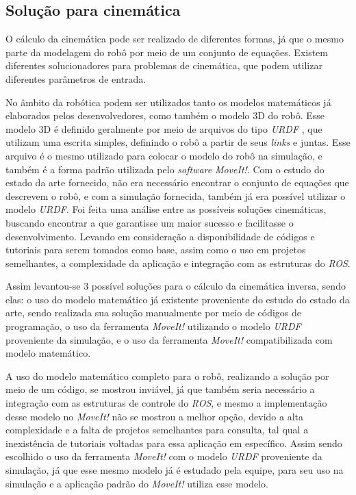 \subsection{Solução para cinemática}\label{sec:sol_cine}
O cálculo da cinemática pode ser realizado de diferentes formas, já que o mesmo parte da modelagem do robô por meio de um conjunto de equações. Existem diferentes solucionadores para problemas de cinemática, que podem utilizar diferentes parâmetros de entrada.

No âmbito da robótica podem ser utilizados tanto os modelos matemáticos já elaborados pelos desenvolvedores, como também o modelo 3D do robô. Esse modelo 3D é definido geralmente por meio de arquivos do tipo \textit{URDF} , que utilizam uma escrita simples, definindo o robô a partir de seus \textit{links} e juntas. Esse arquivo é o mesmo utilizado para colocar o modelo do robô na simulação, e também é a forma padrão utilizada pelo \textit{software} \textit{MoveIt!}.
Com o estudo do estado da arte fornecido, não era necessário encontrar o conjunto de equações que descrevem o robô, e com a simulação fornecida, também já era possível utilizar o modelo \textit{URDF}. Foi feita uma análise entre as possíveis soluções cinemáticas, buscando encontrar a que garantisse um maior sucesso e facilitasse o desenvolvimento. Levando em consideração a disponibilidade de códigos e tutoriais para serem tomados como base, assim como o uso em projetos semelhantes, a complexidade da aplicação e integração com as estruturas do \textit{ROS}.

Assim levantou-se 3 possível soluções para o cálculo da cinemática inversa, sendo elas: o uso do modelo matemático já existente proveniente do estudo do estado da arte, sendo realizada sua solução manualmente por meio de códigos de programação, o uso da ferramenta \textit{MoveIt!} utilizando o modelo \textit{URDF} proveniente da simulação, e o uso da ferramenta \textit{MoveIt!} compatibilizada com modelo matemático.

A uso do modelo matemático completo para o robô, realizando a  solução por meio de um código, se mostrou inviável, já que também seria necessário a integração com as estruturas de controle do \textit{ROS}, e mesmo a implementação desse modelo no \textit{MoveIt!} não se mostrou a melhor opção, devido a alta complexidade e a falta de projetos semelhantes para consulta, tal qual a inexistência de tutoriais voltadas para essa aplicação em específico. Assim sendo escolhido o uso da ferramenta \textit{MoveIt!} com o modelo \textit{URDF} proveniente da simulação, já que esse mesmo modelo já é estudado pela equipe, para seu uso na simulação e a aplicação padrão do \textit{MoveIt!} utiliza esse modelo.


